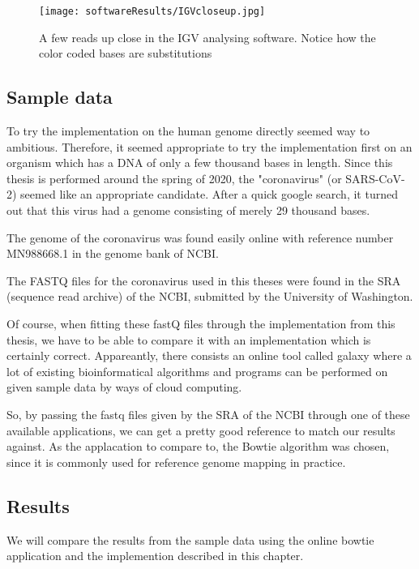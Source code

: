 \begin{figure}[H]
	\centering
	\texttt{[image: softwareResults/IGVcloseup.jpg]}
	\caption{A few reads up close in the IGV analysing software. Notice how the color coded bases are substitutions}
	\label{fig:IGVcloseup}
\end{figure}

\subsection{Sample data}

To try the implementation on the human genome directly seemed way to ambitious. Therefore, it seemed appropriate to try the implementation first on an organism which has a DNA of only a few thousand bases in length.
Since this thesis is performed around the spring of 2020, the "coronavirus" (or SARS-CoV-2) seemed like an appropriate candidate. After a quick google search, it turned out that this virus had a genome consisting of merely 29 thousand bases.

The genome of the coronavirus was found easily online with reference number MN988668.1 in the genome bank of NCBI.

The FASTQ files for the coronavirus used in this theses were found in the SRA (sequence read archive) of the NCBI, submitted by the University of Washington.

Of course, when fitting these fastQ files through the implementation from this thesis, we have to be able to compare it with an implementation which is certainly correct. Appareantly, there consists an online tool called galaxy where a lot of existing bioinformatical algorithms and programs can be performed on given sample data by ways of cloud computing. 

So, by passing the fastq files given by the SRA of the NCBI through one of these available applications, we can get a pretty good reference to match our results against. As the applacation to compare to, the Bowtie algorithm was chosen, since it is commonly used for reference genome mapping in practice.

\subsection{Results}

We will compare the results from the sample data using the online bowtie application and the implemention described in this chapter.


